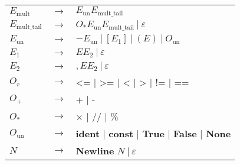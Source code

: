 \documentclass[a4paper, 12pt]{report}
\begin{document}
\begin{figure}[!h]
\begin{center}
{\begin{tabular}{lcl}
$E_\text{mult}$ & $\to$ & $E_\text{un}E_\text{mult\_tail}$\\
$E_\text{mult\_tail}$ & $\to$ & $O_* E_\text{un} E_\text{mult\_tail} \ | \ \varepsilon$\\
$E_\text{un}$ & $\to$ & $- E_\text{un} \ | \  [E_1] \ | \ (E) \ | \ O_\text{un}$\\
$E_1$ & $\to$ & $E E_2 \ | \ \varepsilon$\\
$E_2$ & $\to$ & $, E E_2 \ | \ \varepsilon$\\
$O_r$ & $\to$ & <= | >= | < | > | != | ==\\
$O_+$ & $\to$ & + | -\\
$O_*$ & $\to$ & $\times$ | // | \%\\
$O_\text{un}$ & $\to$ &  \textbf{ident} | \textbf{const} | \textbf{True} | \textbf{False} | \textbf{None}\\
$N$ & $\to$ & \textbf{Newline} $N \ | \ \varepsilon$\\
\end{tabular}
}
\end{center}\end{figure}
\end{document}
